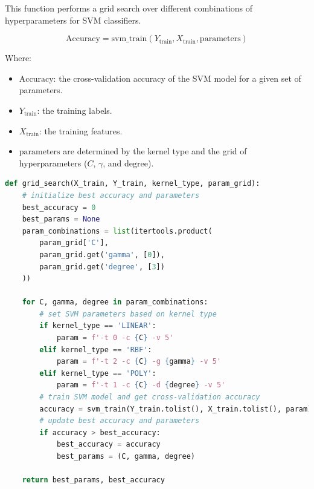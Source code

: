 \documentclass{homework}
\begin{document}
This function performs a grid search over different combinations of hyperparameters for SVM classifiers.%

\[
\text{Accuracy} = \text{svm\_train}(Y_{\text{train}}, X_{\text{train}}, \text{parameters})
\]

Where:

\begin{itemize}
    \item \( \text{Accuracy} \): the cross-validation accuracy of the SVM model for a given set of parameters.
    \item \( Y_{\text{train}} \): the training labels.
    \item \( X_{\text{train}} \): the training features.
    \item \(\text{parameters}\) are determined by the kernel type and the grid of hyperparameters (\(C\), \(\gamma\), and \( \text{degree} \)).
\end{itemize}

\begin{lstlisting}[language=Python]
def grid_search(X_train, Y_train, kernel_type, param_grid):
    # initialize best accuracy and parameters
    best_accuracy = 0
    best_params = None
    param_combinations = list(itertools.product(
        param_grid['C'], 
        param_grid.get('gamma', [0]),
        param_grid.get('degree', [3])
    ))
    
    for C, gamma, degree in param_combinations:
        # set SVM parameters based on kernel type
        if kernel_type == 'LINEAR':
            param = f'-t 0 -c {C} -v 5'
        elif kernel_type == 'RBF':
            param = f'-t 2 -c {C} -g {gamma} -v 5'
        elif kernel_type == 'POLY':
            param = f'-t 1 -c {C} -d {degree} -v 5'
        # train SVM model and get cross-validation accuracy
        accuracy = svm_train(Y_train.tolist(), X_train.tolist(), param)
        # update best accuracy and parameters
        if accuracy > best_accuracy:
            best_accuracy = accuracy
            best_params = (C, gamma, degree)
    
    return best_params, best_accuracy
\end{lstlisting}

\end{document}
